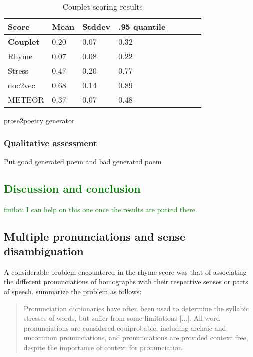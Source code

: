 \documentclass[11pt,a4paper]{article}
\begin{document}
\begin{table*}[ht]
\begin{subtable}{0.5\textwidth}
\end{subtable}
\begin{subtable}{0.5\textwidth}
\begin{tabular}{llll c c c c}
	\hline
	Score & Mean & Stddev & .95 quantile \\ [0.5ex]
	\hline
	\textbf{Couplet} & 0.20 & 0.07 & 0.32 \\ [0.5ex]
	\hline
	Rhyme & 0.07 & 0.08 & 0.22 \\ [0.5ex]
	\hline
	Stress & 0.47 & 0.20 & 0.77 \\ [0.5ex]
	\hline
	doc2vec & 0.68 & 0.14 & 0.89 \\ [0.5ex]
	\hline
	METEOR & 0.37 & 0.07 & 0.48 \\ [0.5ex]
	\hline
\end{tabular}
\caption{prose2poetry generator}
\end{subtable}
\caption{Couplet scoring results}
\label{table:couplet_results}
\end{table*}

\subsubsection{Qualitative assessment}
Put good generated poem and bad generated poem

\textcolor{green}{
\section{Discussion and conclusion}
\label{sec:discconc}
fmilot: I can help on this one once the results are putted there.
}

\subsection{Multiple pronunciations and sense disambiguation}
\label{sec:synset}

A considerable problem encountered in the rhyme score was that of associating the different pronunciations of homographs with their respective senses or parts of speech. \citet{hopkins-kiela-2017} summarize the problem as follows:

\begin{quote}
Pronunciation dictionaries have often been used to determine the syllabic stresses of words, but suffer from some limitations [...]. All word pronunciations are considered equiprobable, including archaic and uncommon pronunciations, and pronunciations are provided context free, despite the importance of context for pronunciation.
\end{quote}
\end{document}
